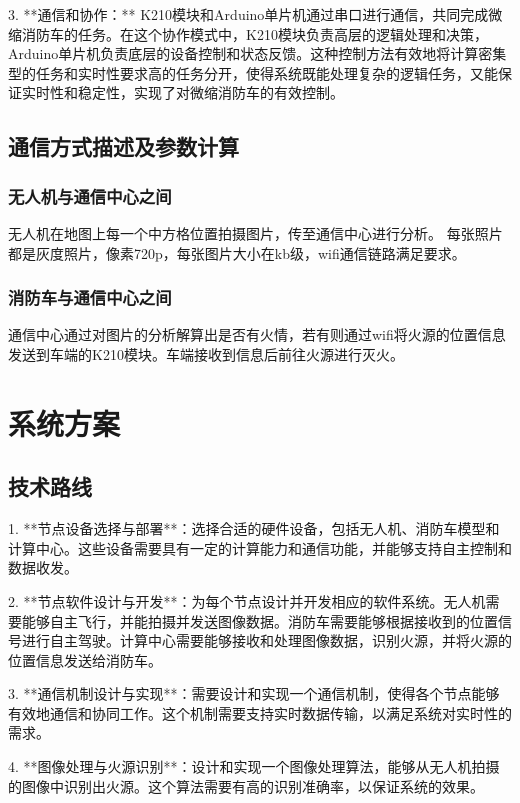 \documentclass[12pt, a4paper, oneside]{article}
\begin{document}
3. **通信和协作：** K210模块和Arduino单片机通过串口进行通信，共同完成微缩消防车的任务。在这个协作模式中，K210模块负责高层的逻辑处理和决策，Arduino单片机负责底层的设备控制和状态反馈。这种控制方法有效地将计算密集型的任务和实时性要求高的任务分开，使得系统既能处理复杂的逻辑任务，又能保证实时性和稳定性，实现了对微缩消防车的有效控制。

\subsection{通信方式描述及参数计算}

\subsubsection{无人机与通信中心之间}

无人机在地图上每一个中方格位置拍摄图片，传至通信中心进行分析。
每张照片都是灰度照片，像素720p，每张图片大小在kb级，wifi通信链路满足要求。

\subsubsection{消防车与通信中心之间}

通信中心通过对图片的分析解算出是否有火情，若有则通过wifi将火源的位置信息发送到车端的K210模块。车端接收到信息后前往火源进行灭火。

\section{系统方案}

\subsection{技术路线}

1. **节点设备选择与部署**：选择合适的硬件设备，包括无人机、消防车模型和计算中心。这些设备需要具有一定的计算能力和通信功能，并能够支持自主控制和数据收发。

2. **节点软件设计与开发**：为每个节点设计并开发相应的软件系统。无人机需要能够自主飞行，并能拍摄并发送图像数据。消防车需要能够根据接收到的位置信号进行自主驾驶。计算中心需要能够接收和处理图像数据，识别火源，并将火源的位置信息发送给消防车。

3. **通信机制设计与实现**：需要设计和实现一个通信机制，使得各个节点能够有效地通信和协同工作。这个机制需要支持实时数据传输，以满足系统对实时性的需求。

4. **图像处理与火源识别**：设计和实现一个图像处理算法，能够从无人机拍摄的图像中识别出火源。这个算法需要有高的识别准确率，以保证系统的效果。
\end{document}
